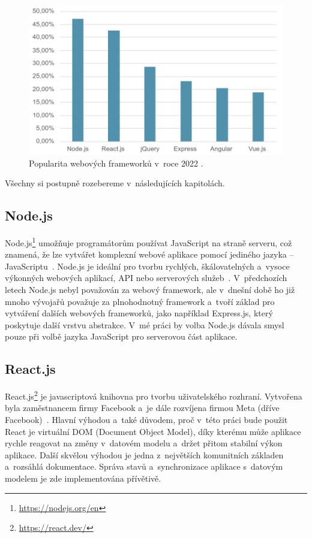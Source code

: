 \begin{figure}[H]
    \centering
    \includegraphics[width=\textwidth]{obrazky-figures/table1.png}
    \caption{Popularita webových frameworků v~roce 2022 \cite{stackoverflow}.}
    \label{graf:stack}
\end{figure}
Všechny si postupně rozebereme v~následujících kapitolách.
\subsection{Node.js}
Node.js\footnote{\url{https://nodejs.org/en}} umožňuje programátorům používat JavaScript na straně serveru, což znamená, že lze vytvářet komplexní webové aplikace pomocí jediného jazyka -- JavaScriptu~\cite{mal_2010_nodejs}. Node.js je ideální pro tvorbu rychlých, škálovatelných a~vysoce výkonných webových aplikací, API nebo serverových služeb~\cite{barborakoouskov_2020_pro}. V~předchozích letech Node.js nebyl považován za webový framework, ale v~dnešní době ho již mnoho vývojařů považuje za plnohodnotný framework a~tvoří základ pro vytváření dalších webových frameworků, jako například Express.js, který poskytuje další vrstvu abstrakce. V~mé práci by volba Node.js dávala smysl pouze při volbě jazyka JavaScript pro serverovou část aplikace.

\subsection{React.js}
React.js\footnote{\url{https://react.dev/}} je javascriptová knihovna pro tvorbu uživatelského rozhraní. Vytvořena byla zaměstnancem firmy Facebook a~je dále rozvíjena firmou Meta (dříve Facebook)~\cite{fedosejev2015react}. Hlavní výhodou a~také důvodem, proč v~této práci bude použit React je virtuální DOM (Document Object Model), díky kterému může aplikace rychle reagovat na změny v~datovém modelu a~držet přitom stabilní výkon aplikace. Další skvělou výhodou je jedna z~největších komunitních základen a~rozsáhlá dokumentace. Správa stavů a~synchronizace aplikace s~datovým modelem je zde implementována přívětivě.

